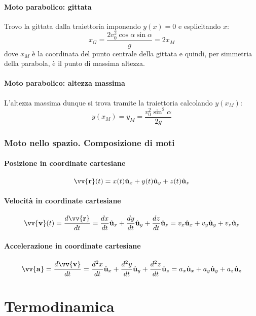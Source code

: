 \documentclass{report}
\newcommand{\versore}[1]{\hat{\mathbf{u}}_{#1}}
\newcommand{\ux}{\versore{x}}
\newcommand{\uy}{\versore{y}}
\newcommand{\uz}{\versore{z}}
\newcommand{\vett}[1]{\vv{\boldsymbol{\mathbf{#1}}}}
\begin{document}
\subsection{Moto parabolico: gittata}
Trovo la gittata dalla traiettoria imponendo \(y(x) = 0\) e esplicitando \(x\):
\begin{equation*}
    x_G = \frac{2v_0^2\cos\alpha\sin\alpha}{g} = 2x_M
\end{equation*}
dove \(x_M\) è la coordinata del punto centrale della gittata e quindi, 
per simmetria della parabola, è il punto di massima altezza. 

\subsection{Moto parabolico: altezza massima}
L'altezza massima dunque si trova tramite la traiettoria calcolando \(y(x_M)\):
\begin{equation*}
    y(x_M) = y_M = \frac{v_0^2\sin^2\alpha}{2g}
\end{equation*}

\section{Moto nello spazio. Composizione di moti}
\subsection{Posizione in coordinate cartesiane}
\begin{equation*}
    \vett{r}(t) = x(t)\ux + y(t)\uy + z(t)\uz
\end{equation*}

\subsection{Velocità in coordinate cartesiane}
\begin{equation*}
    \vett{v}(t) = \frac{d\vett{r}}{dt} 
    = \frac{dx}{dt}\ux + \frac{dy}{dt}\uy + \frac{dz}{dt}\uz
    = v_x\ux + v_y\uy + v_z\uz
\end{equation*}

\subsection{Accelerazione in coordinate cartesiane}
\begin{equation*}
    \vett{a} = \frac{d\vett{v}}{dt} 
    = \frac{d^2x}{dt}\ux + \frac{d^2y}{dt}\uy + \frac{d^2z}{dt}\uz
    = a_x\ux + a_y\uy + a_z\uz
\end{equation*}





\part{Termodinamica}
\end{document}
